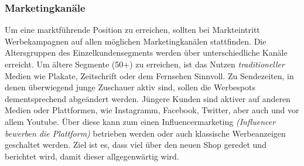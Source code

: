 \subsubsection{Marketingkanäle}
Um eine marktführende Position zu erreichen, sollten bei Markteintritt Werbekampagnen auf allen möglichen Marketingkanälen stattfinden. Die Altersgruppen des Einzelkundensegments werden über unterschiedliche Kanäle erreicht. Um ältere Segmente (50+) zu erreichen, ist das Nutzen \textit{traditioneller} Medien wie Plakate, Zeitschrift oder dem Fernsehen Sinnvoll. Zu Sendezeiten, in denen überwiegend junge Zuschauer aktiv sind, sollen die Werbespots dementsprechend abgeändert werden. Jüngere Kunden sind aktiver auf anderen Medien oder Plattformen, wie Instagramm, Facebook, Twitter, aber auch und vor allem Youtube. Über diese kann zum einen Influencermarketing \textit{(Influencer bewerben die Plattform)} betrieben werden oder auch klassische Werbeanzeigen geschaltet werden. Ziel ist es, dass viel über den neuen Shop geredet und berichtet wird, damit dieser allgegenwärtig wird.

